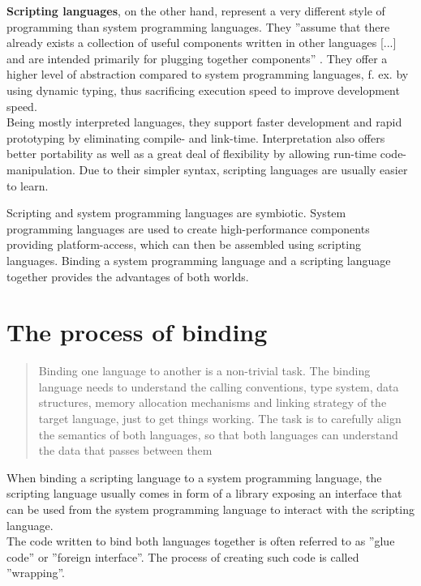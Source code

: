 \textbf{Scripting languages}, on the other hand, represent a very different style of programming than system programming languages. They ''assume that there already exists a collection of useful components written in other languages [...] and are intended primarily for plugging together components'' . They offer a higher level of abstraction compared to system programming languages, f. ex. by using dynamic typing, thus sacrificing execution speed to improve development speed.\\ Being mostly interpreted languages, they support faster development and rapid prototyping by eliminating compile- and link-time. Interpretation also offers better portability as well as a great deal of flexibility by allowing run-time code-manipulation. Due to their simpler syntax, scripting languages are usually easier to learn.

Scripting and system programming languages are symbiotic. System programming languages are used to create high-performance components providing platform-access, which can then be assembled using scripting languages. Binding a system programming language and a scripting language together provides the advantages of both worlds.


\section{The process of binding}

\begin{quotation}
Binding one language to another is a non-trivial task. The binding language needs to understand the calling conventions, type system, data structures, memory allocation mechanisms and linking strategy of the target language, just to get things working. The task is to carefully align the semantics of both languages, so that both languages can understand the data that passes between them
\end{quotation}

When binding a scripting language to a system programming language, the scripting language usually comes in form of a library exposing an interface that can be used from the system programming language to interact with the scripting language.\\
The code written to bind both languages together is often referred to as ''glue code'' or ''foreign interface''. The process of creating such code is called ''wrapping''.

